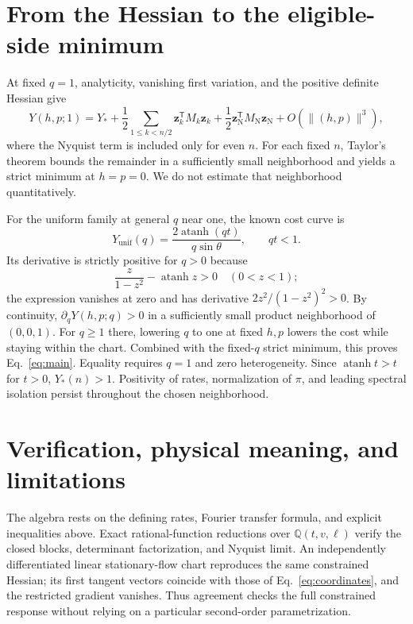 \documentclass[aps,pre,onecolumn,11pt,notitlepage,nofootinbib]{revtex4-2}
\newcommand{\atanh}{\operatorname{atanh}}
\begin{document}
\section{From the Hessian to the eligible-side minimum}
At fixed $q=1$, analyticity, vanishing first variation, and the positive definite Hessian give
\begin{equation}
 Y(h,p;1)=Y_*+\frac12\sum_{1\leq k<n/2}\bm z_k^{\mathsf T}M_k\bm z_k
       +\frac12\bm z_{\mathrm N}^{\mathsf T}M_{\mathrm N}\bm z_{\mathrm N}
       +O(\|(h,p)\|^3),
 \label{eq:taylor}
\end{equation}
where the Nyquist term is included only for even $n$. For each fixed $n$, Taylor's theorem bounds the remainder in a sufficiently small neighborhood and yields a strict minimum at $h=p=0$. We do not estimate that neighborhood quantitatively.

For the uniform family at general $q$ near one, the known cost curve is
\begin{equation}
 Y_{\mathrm{unif}}(q)=\frac{2\atanh(qt)}{q\sin\theta},\qquad qt<1.
 \label{eq:uniformcost}
\end{equation}
Its derivative is strictly positive for $q>0$ because
\begin{equation}
 \frac{z}{1-z^2}-\atanh z>0\quad(0<z<1);
\end{equation}
the expression vanishes at zero and has derivative $2z^2/(1-z^2)^2>0$. By continuity, $\partial_qY(h,p;q)>0$ in a sufficiently small product neighborhood of $(0,0,1)$. For $q\geq1$ there, lowering $q$ to one at fixed $h,p$ lowers the cost while staying within the chart. Combined with the fixed-$q$ strict minimum, this proves Eq.~\eqref{eq:main}. Equality requires $q=1$ and zero heterogeneity. Since $\atanh t>t$ for $t>0$, $Y_*(n)>1$. Positivity of rates, normalization of $\pi$, and leading spectral isolation persist throughout the chosen neighborhood.

\section{Verification, physical meaning, and limitations}
The algebra rests on the defining rates, Fourier transfer formula, and explicit inequalities above. Exact rational-function reductions over $\mathbb Q(t,v,\ell)$ verify the closed blocks, determinant factorization, and Nyquist limit. An independently differentiated linear stationary-flow chart reproduces the same constrained Hessian; its first tangent vectors coincide with those of Eq.~\eqref{eq:coordinates}, and the restricted gradient vanishes. Thus agreement checks the full constrained response without relying on a particular second-order parametrization.
\end{document}

